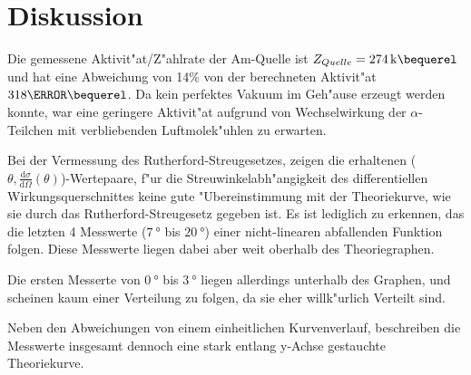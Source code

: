 \section{Diskussion}
\label{sec:Diskussion}
  Die gemessene Aktivit"at/Z"ahlrate der Am-Quelle ist $Z_{Quelle}=\SI{274}{\kilo \bequerel}$ und hat eine Abweichung von 14\% von der berechneten Aktivit"at $\si{318}{\kilo \bequerel}$.
  Da kein perfektes Vakuum im Geh"ause erzeugt werden konnte, war eine geringere Aktivit"at aufgrund von Wechselwirkung der $\alpha$-Teilchen mit verbliebenden Luftmolek"uhlen zu erwarten.
  
  Bei der Vermessung des Rutherford-Streugesetzes, zeigen die erhaltenen ($\theta,\frac{\text{d}\sigma}{\text{d}\Omega}(\theta)$)-Wertepaare, f"ur die Streuwinkelabh"angigkeit des differentiellen Wirkungsquerschnittes keine gute "Ubereinstimmung mit der Theoriekurve, wie sie durch das Rutherford-Streugesetz gegeben ist.
  Es ist lediglich zu erkennen, das die letzten 4 Messwerte ($\SI{7}{\degree}$ bis $\SI{20}{\degree}$) einer nicht-linearen abfallenden Funktion folgen.
  Diese Messwerte liegen dabei aber weit oberhalb des Theoriegraphen.

  Die ersten Messerte von $\SI{0}{\degree}$ bis $\SI{3}{\degree}$ liegen allerdings unterhalb des Graphen, und scheinen kaum einer Verteilung zu folgen, da sie eher willk"urlich Verteilt sind.

  Neben den Abweichungen von einem einheitlichen Kurvenverlauf, beschreiben die Messwerte insgesamt dennoch eine stark entlang y-Achse gestauchte Theoriekurve.
